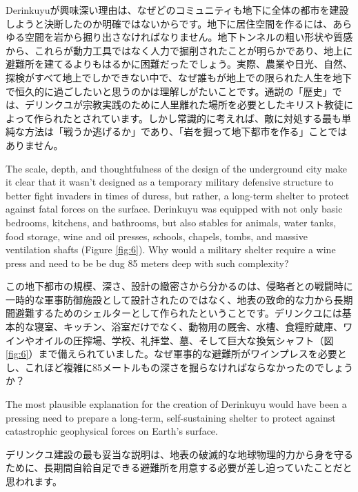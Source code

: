 \documentclass[10pt,twocolumn,letterpaper]{article}
\begin{document}
Derinkuyuが興味深い理由は、なぜどのコミュニティも地下に全体の都市を建設しようと決断したのか明確ではないからです。地下に居住空間を作るには、あらゆる空間を岩から掘り出さなければなりません。地下トンネルの粗い形状や質感から、これらが動力工具ではなく人力で掘削されたことが明らかであり、地上に避難所を建てるよりもはるかに困難だったでしょう。実際、農業や日光、自然、探検がすべて地上でしかできない中で、なぜ誰もが地上での限られた人生を地下で恒久的に過ごしたいと思うのかは理解しがたいことです。通説の「歴史」では、デリンクユが宗教実践のために人里離れた場所を必要としたキリスト教徒によって作られたとされています\cite{53}。しかし常識的に考えれば、敵に対処する最も単純な方法は「戦うか逃げるか」であり、「岩を掘って地下都市を作る」ことではありません。

The scale, depth, and thoughtfulness of the design of the underground city make it clear that it wasn't designed as a temporary military defensive structure to better fight invaders in times of duress, but rather, a long-term shelter to protect against fatal forces on the surface. Derinkuyu was equipped with not only basic bedrooms, kitchens, and bathrooms, but also stables for animals, water tanks, food storage, wine and oil presses, schools, chapels, tombs, and massive ventilation shafts (Figure \ref{fig:6}). Why would a military shelter require a wine press and need to be be dug 85 meters deep with such complexity?

この地下都市の規模、深さ、設計の緻密さから分かるのは、侵略者との戦闘時に一時的な軍事防御施設として設計されたのではなく、地表の致命的な力から長期間避難するためのシェルターとして作られたということです。デリンクユには基本的な寝室、キッチン、浴室だけでなく、動物用の厩舎、水槽、食糧貯蔵庫、ワインやオイルの圧搾場、学校、礼拝堂、墓、そして巨大な換気シャフト（図\ref{fig:6}）まで備えられていました。なぜ軍事的な避難所がワインプレスを必要とし、これほど複雑に85メートルもの深さを掘らなければならなかったのでしょうか？

The most plausible explanation for the creation of Derinkuyu would have been a pressing need to prepare a long-term, self-sustaining shelter to protect against catastrophic geophysical forces on Earth's surface.

デリンクユ建設の最も妥当な説明は、地表の破滅的な地球物理的力から身を守るために、長期間自給自足できる避難所を用意する必要が差し迫っていたことだと思われます。
\end{document}
